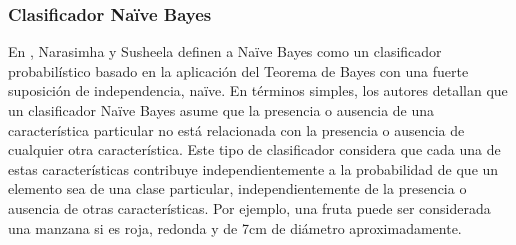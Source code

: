 \subsubsection{Clasificador Na\"{i}ve Bayes}

	En \cite{NarasMurty}, Narasimha y Susheela definen a Na\"{i}ve Bayes como un clasificador probabilístico basado en la aplicación del Teorema de Bayes con una fuerte suposición de independencia, na\"{i}ve. En términos simples, los autores detallan que un clasificador Na\"{i}ve Bayes asume que la presencia o ausencia de una característica particular no está relacionada con la presencia o ausencia de cualquier otra característica. Este tipo de clasificador considera que cada una de estas características contribuye independientemente a la probabilidad de que un elemento sea de una clase particular, independientemente de la presencia o ausencia de otras características. Por ejemplo, una fruta puede ser considerada una manzana si es roja, redonda y de 7cm de diámetro aproximadamente.

